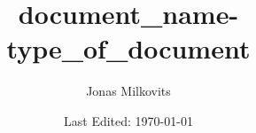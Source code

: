 


\begin{titlepage}
  \title{document_name-type_of_document}
  \author{Jonas Milkovits}
  \date{Last Edited: \today}
\end{titlepage}



\maketitle
{} %
\tableofcontents
\clearpage
\listoftheorems[ignoreall, show={definition, Definition}]
\clearpage
{} %


\appendix
{}

\clearpage


\clearpage


\clearpage


\clearpage


